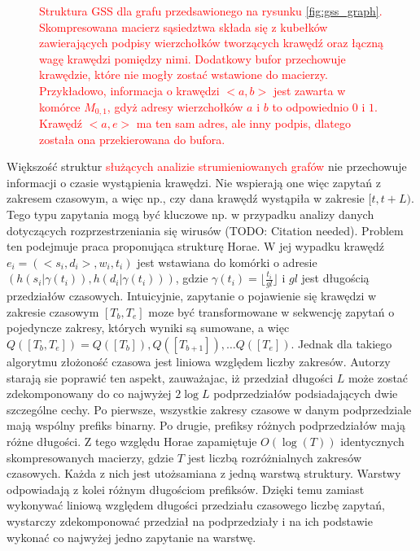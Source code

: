 \begin{figure}[htb]
\begin{tikzpicture}[scale=0.8, every node/.style={scale=0.8},legend node/.style={minimum height=5mm, minimum width=5mm, draw},
                legend text/.style={right}]
    \end{tikzpicture}
            \caption{\textcolor{red}{Struktura GSS dla grafu przedsawionego na rysunku \ref{fig:gss_graph}. Skompresowana macierz sąsiedztwa składa się z kubełków zawierających podpisy wierzchołków tworzących krawędź oraz łączną wagę krawędzi pomiędzy nimi. Dodatkowy bufor przechowuje krawędzie, które nie mogły zostać wstawione do macierzy. Przykładowo, informacja o krawędzi $<a,b>$ jest zawarta w komórce $M_{0,1}$, gdyż adresy wierzchołków $a$ i $b$ to odpowiednio $0$ i $1$. Krawędź $<a,e>$ ma ten sam adres, ale inny podpis, dlatego została ona przekierowana do bufora.}}
            \label{fig:gss_structure}
    \end{figure}

    Większość struktur \textcolor{red}{służących analizie strumieniowanych grafów} nie przechowuje informacji o czasie wystąpienia krawędzi. Nie wspierają one więc zapytań z zakresem czasowym, a więc np., czy dana krawędź wystąpiła w zakresie $[t, t + L)$. Tego typu zapytania mogą być kluczowe np. w przypadku analizy danych dotyczących rozprzestrzeniania się wirusów (TODO: Citation needed). Problem ten podejmuje praca proponująca strukturę Horae\cite{Chen_Zhou_Chen_Xiao_Jin_Li_2022}. W jej wypadku krawędź $e_i = (<s_i, d_i>, w_i, t_i)$ jest wstawiana do komórki o adresie $(h(s_i | \gamma(t_i)), h(d_i | \gamma(t_i)))$, gdzie $\gamma(t_i) = \lfloor \frac{t_i}{gl} \rfloor$ i $gl$ jest długością przedziałów czasowych. Intuicyjnie, zapytanie o pojawienie się krawędzi w zakresie czasowym $[T_b, T_e]$ moze być transformowane w sekwencję zapytań o pojedyncze zakresy, których wyniki są sumowane, a więc $Q([T_b, T_e]) = Q([T_b]), Q([T_{b+1}]), \dots Q([T_e])$. Jednak dla takiego algorytmu złożoność czasowa jest liniowa względem liczby zakresów. Autorzy starają sie poprawić ten aspekt, zauważajac, iż przedział długości $L$ może zostać zdekomponowany do co najwyżej $2\log{L}$ podprzedziałów podsiadających dwie szczególne cechy. Po pierwsze, wszystkie zakresy czasowe w danym podprzedziale mają wspólny prefiks binarny. Po drugie, prefiksy różnych podprzedziałów mają różne długości. Z tego względu Horae zapamiętuje $O(\log(T))$ identycznych skompresowanych macierzy, gdzie $T$ jest liczbą rozróżnialnych zakresów czasowych. Każda z nich jest utożsamiana z jedną warstwą struktury. Warstwy odpowiadają z kolei różnym długościom prefiksów. Dzięki temu zamiast wykonywać liniową względem długości przedziału czasowego liczbę zapytań, wystarczy zdekomponować przedział na podprzedziały i na ich podstawie wykonać co najwyżej jedno zapytanie na warstwę. 
    
